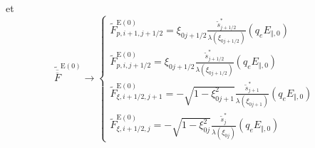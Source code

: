  et \[
\widetilde{\overline{\overline{F}}}^{\text{E}(0)}\rightarrow\left\{ \begin{array}{l}
\widetilde{F}_{p,i+1,j+1/2}^{\text{E}(0)}=\xi_{0j+1/2}\frac{\widetilde{s}_{j+1/2}^{*}}{\lambda\left(\xi_{0j+1/2}\right)}(q_{e}E_{\Vert,0})\\
\widetilde{F}_{p,i,j+1/2}^{\text{E}(0)}=\xi_{0j+1/2}\frac{\widetilde{s}_{j+1/2}^{*}}{\lambda\left(\xi_{0j+1/2}\right)}(q_{e}E_{\Vert,0})\\
\widetilde{F}_{\xi,i+1/2,j+1}^{\text{E}(0)}=-\sqrt{1-\xi_{0j+1}^{2}}\frac{\widetilde{s}_{j+1}^{*}}{\lambda\left(\xi_{0j+1}\right)}(q_{e}E_{\Vert,0})\\
\widetilde{F}_{\xi,i+1/2,j}^{\text{E}(0)}=-\sqrt{1-\xi_{0j}^{2}}\frac{\widetilde{s}_{j}^{*}}{\lambda\left(\xi_{0j}\right)}(q_{e}E_{\Vert,0})\end{array}\right.\]

